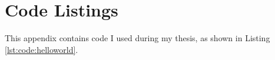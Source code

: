 \chapter{Code Listings}
\label{app:code}

This appendix contains code I used during my thesis, as shown in Listing \ref{lst:code:helloworld}.


